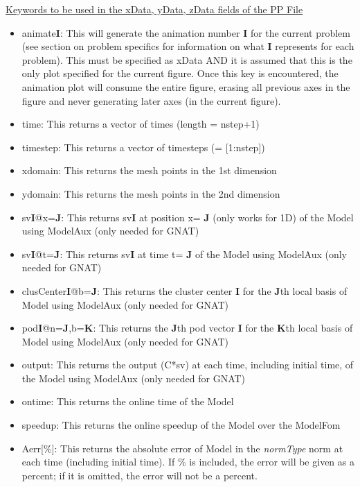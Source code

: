 \documentclass[notitlepage]{report}
\begin{document}
\vspace{2mm}
\noindent \underline{Keywords to be used in the xData, yData, zData fields of the PP File}
\begin{itemize}
  \item animate\textbf{I}: This will generate the animation number \textbf{I} for the current problem (see section on problem specifics for information on what \textbf{I} represents for each problem).  This must be specified as xData AND it is assumed that this is the only plot specified for the current figure.  Once this key is encountered, the animation plot will consume the entire figure, erasing all previous axes in the figure and never generating later axes (in the current figure).
  \item time: This returns a vector of times (length = nstep+1)
  \item timestep: This returns a vector of timesteps (= [1:nstep])
  \item xdomain: This returns the mesh points in the 1st dimension
  \item ydomain: This returns the mesh points in the 2nd dimension
  \item sv\textbf{I}@x=\textbf{J}: This returns sv\textbf{I} at position x= \textbf{J} (only works for 1D) of the Model using ModelAux (only needed for GNAT)
  \item sv\textbf{I}@t=\textbf{J}:  This returns sv\textbf{I} at time t= \textbf{J}  of the Model using ModelAux (only needed for GNAT)
  \item clusCenter\textbf{I}@b=\textbf{J}: This returns the cluster center \textbf{I} for the \textbf{J}th local basis of Model using ModelAux (only needed for GNAT)
  \item pod\textbf{I}@n=\textbf{J},b=\textbf{K}: This returns the \textbf{J}th pod vector \textbf{I} for the \textbf{K}th local basis of Model using ModelAux (only needed for GNAT)
  \item output: This returns the output (C*sv) at each time, including initial time,  of the Model using ModelAux (only needed for GNAT)
  \item ontime: This returns the online time of the Model
  \item speedup: This returns the online speedup of the Model over the ModelFom
    \item Aerr[\%]: This returns the absolute error of Model in the \textit{normType} norm at each time (including initial time).  If $\%$ is included, the error will be given as a percent; if it is omitted, the error will not be a percent.

\end{itemize}
\end{document}
